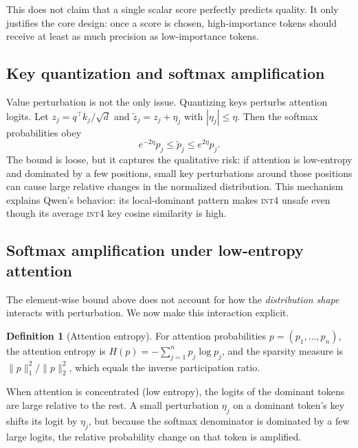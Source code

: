 \documentclass[11pt]{article}
\newcommand{\intiv}{\textsc{int4}}
\theoremstyle{plain}
\theoremstyle{definition}
\newtheorem{definition}{Definition}
\begin{document}
This does not claim that a single scalar score perfectly predicts quality.  It only justifies the core design: once a score is chosen, high-importance tokens should receive at least as much precision as low-importance tokens.

\subsection{Key quantization and softmax amplification}
Value perturbation is not the only issue.  Quantizing keys perturbs attention logits.  Let $z_j=q^\top k_j/\sqrt{d}$ and $\tilde z_j=z_j+\eta_j$ with $|\eta_j|\le \eta$.  Then the softmax probabilities obey
\begin{equation}
  e^{-2\eta}p_j \le \tilde p_j \le e^{2\eta}p_j .
\end{equation}
The bound is loose, but it captures the qualitative risk: if attention is low-entropy and dominated by a few positions, small key perturbations around those positions can cause large relative changes in the normalized distribution.  This mechanism explains Qwen's behavior: its local-dominant pattern makes \intiv{} unsafe even though its average \intiv{} key cosine similarity is high.

\subsection{Softmax amplification under low-entropy attention}
\label{sec:softmax-amp}

The element-wise bound above does not account for how the \emph{distribution shape} interacts with perturbation.  We now make this interaction explicit.

\begin{definition}[Attention entropy]
For attention probabilities $p=(p_1,\ldots,p_n)$, the attention entropy is $H(p)=-\sum_{j=1}^n p_j\log p_j$, and the sparsity measure is $\|p\|_1^2/\|p\|_2^2$, which equals the inverse participation ratio.
\end{definition}

When attention is concentrated (low entropy), the logits of the dominant tokens are large relative to the rest.  A small perturbation $\eta_j$ on a dominant token's key shifts its logit by $\eta_j$, but because the softmax denominator is dominated by a few large logits, the relative probability change on that token is amplified.
\end{document}
